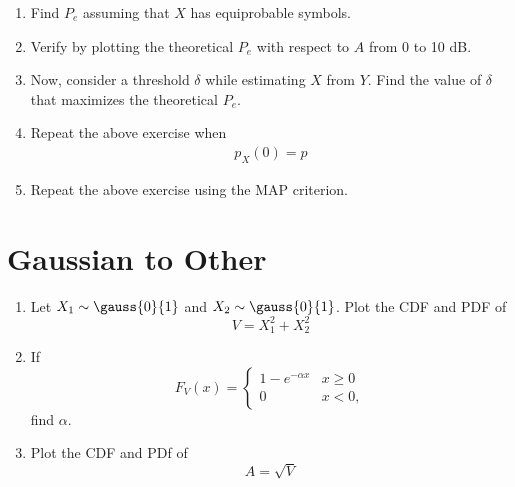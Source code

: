 \documentclass[journal,12pt,twocolumn]{IEEEtran}
\begin{document}
\begin{enumerate}[label=\thesection.\arabic*
,ref=\thesection.\theenumi]
\begin{enumerate}[label=\thesection.\arabic*
,ref=\thesection.\theenumi]
\begin{align}
		  &= 1 - F_{N}\brak{A}\\
		  &= F_{N}\brak{-A}\\
		  &= 0 \label{eq-5.5.2}
  \end{align}
The above calculations are coded in below python file,
  \begin{lstlisting}
    wget  https://github.com/Charanyash/Random-Numbers-/tree/main/codes/Q5/5.5.py
  \end{lstlisting}
  Run the following command
  \begin{lstlisting}
   python3 5.5.py
  \end{lstlisting}
\item Find $P_e$ assuming that $X$ has equiprobable symbols.
%
\item
Verify by plotting  the theoretical $P_e$ with respect to $A$ from 0 to 10 dB.
%
\item Now, consider a threshold $\delta$  while estimating $X$ from $Y$. Find the value of $\delta$ that maximizes the theoretical $P_e$.
\item Repeat the above exercise when
	\begin{align}
		p_{X}(0) = p
	\end{align}
\item Repeat the above exercise using the MAP criterion.
		\end{enumerate}
\section{Gaussian to Other}
\begin{enumerate}[label=\thesection.\arabic*
,ref=\thesection.\theenumi]
\item
Let $X_1 \sim  \gauss{0}{1}$ and $X_2 \sim  \gauss{0}{1}$. Plot the CDF and PDF of
%
\begin{equation}
V = X_1^2 + X_2^2
\end{equation}
%
%
%
\item
If
%
\begin{equation}
F_{V}(x) =
\begin{cases}
1 - e^{-\alpha x} & x \geq 0 \\
0 & x < 0,
\end{cases}
\end{equation}
%
find $\alpha$.
%
\item
\label{ch3_raleigh_sim}
Plot the CDF and PDf of
%
\begin{equation}
A = \sqrt{V}
\end{equation}
%
\end{enumerate}

\end{enumerate}
\end{document}
